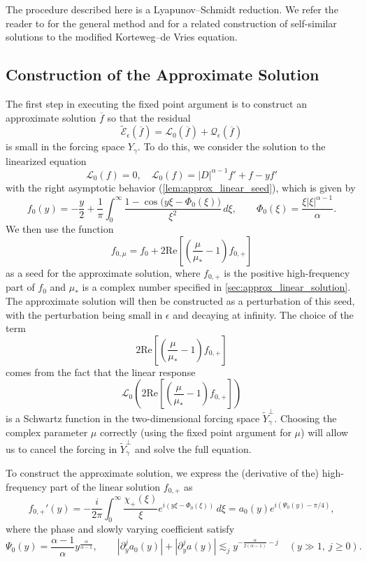 \documentclass[11pt]{amsart}
\theoremstyle{definition}
\theoremstyle{remark}
\numberwithin{equation}{section}
\newcommand{\sq}[1]{\widetilde{#1}}
\newcommand{\mc}[1]{\mathcal{#1}}
\newcommand{\ov}[1]{\overline{#1}}
\begin{document}
The procedure described here is a Lyapunov--Schmidt reduction. We refer the reader to \cite{Kielhofer:bifurcation-theory} for the general method and \cite{Correia-Cote-Vega:asymptotics-mkdv} for a related construction of self-similar solutions to the modified Korteweg--de Vries equation.

\subsection{Construction of the Approximate Solution}

The first step in executing the fixed point argument is to construct an approximate solution $\ov{f}$ so that the residual
\[\sq{\mc{E}}_\epsilon(\ov{f}) = \mc{L}_{0}(\ov{f}) + \mc{Q}_\epsilon(\ov{f})\]
is small in the forcing space $Y_\gamma$. To do this, we consider the solution to the linearized equation
\[\mc{L}_0(f) = 0, \quad \mc{L}_0(f) = |D|^{\alpha - 1}f' + f - yf'\]
with the right asymptotic behavior (\cref{lem:approx_linear_seed}), which is given by
\[f_{0}(y) = -\frac{y}{2} + \frac{1}{\pi}\int_0^\infty
\frac{1-\cos\bigl(y\xi-\Phi_0(\xi)\bigr)}{\xi^2}\,d\xi,
\qquad \Phi_0(\xi)=\frac{\xi|\xi|^{\alpha - 1}}{\alpha}.\]
We then use the function 
\[f_{0, \mu} = f_{0} + 2\text{Re}\left[\left(\frac{\mu}{\mu_*} - 1\right)f_{0,+}\right]\]
as a seed for the approximate solution, where $f_{0,+}$ is the positive high-frequency part of $f_0$ and $\mu_*$ is a complex number specified in \cref{sec:approx_linear_solution}. The approximate solution will then be constructed as a perturbation of this seed, with the perturbation being small in $\epsilon$ and decaying at infinity. The choice of the term
\[2\text{Re}\left[\left(\frac{\mu}{\mu_*} - 1\right)f_{0,+}\right]\]
comes from the fact that the linear response 
\[\mc{L}_0\left(2\text{Re}\left[\left(\frac{\mu}{\mu_*} - 1\right)f_{0,+}\right]\right)\]
is a Schwartz function in the two-dimensional forcing space $\sq{Y}_\gamma^{\perp}$. Choosing the complex parameter $\mu$ correctly (using the fixed point argument for $\mu$) will allow us to cancel the forcing in $\sq{Y}_\gamma^{\perp}$ and solve the full equation. \par
To construct the approximate solution, we express the (derivative of the) high-frequency part of the linear solution $f_{0,+}$ as
\[f_{0,+}'(y) = -\frac{i}{2\pi}\int_0^\infty\frac{\chi_+(\xi)}{\xi}e^{i(y\xi-\Phi_0(\xi))}\,d\xi = a_0(y)e^{i(\Psi_0(y)-\pi/4)},\] 
where the phase and slowly varying coefficient satisfy
\[\Psi_0(y) = \frac{\alpha - 1}{\alpha}y^{\frac{\alpha}{\alpha - 1}}, \qquad |\partial_y^j a_0(y)|+|\partial_y^j a(y)|\lesssim_j y^{-\frac{\alpha}{2(\alpha - 1)}-j} \quad (y\gg1,\ j\geq0).\]
\end{document}

